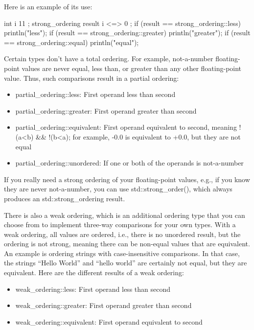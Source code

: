 Here is an example of its use:

\begin{cpp}
int i { 11 };
strong_ordering result { i <=> 0 };
if (result == strong_ordering::less) { println("less"); }
if (result == strong_ordering::greater) { println("greater"); }
if (result == strong_ordering::equal) { println("equal"); }
\end{cpp}

Certain types don’t have a total ordering. For example, not-a-number floating-point values are never equal, less than, or greater than any other floating-point value. Thus, such comparisons result in a partial ordering:

\begin{itemize}
\item
partial\_ordering::less: First operand less than second

\item
partial\_ordering::greater: First operand greater than second

\item
partial\_ordering::equivalent: First operand equivalent to second, meaning !(a<b) \&\& !(b<a); for example, -0.0 is equivalent to +0.0, but they are not equal

\item
partial\_ordering::unordered: If one or both of the operands is not-a-number
\end{itemize}

If you really need a strong ordering of your floating-point values, e.g., if you know they are never not-a-number, you can use std::strong\_order(), which always produces an std::strong\_ordering result.

There is also a weak ordering, which is an additional ordering type that you can choose from to implement three-way comparisons for your own types. With a weak ordering, all values are ordered, i.e., there is no unordered result, but the ordering is not strong, meaning there can be non-equal values that are equivalent. An example is ordering strings with case-insensitive comparisons. In that case, the strings “Hello World” and “hello world” are certainly not equal, but they are equivalent. Here are the different results of a weak ordering:

\begin{itemize}
\item
weak\_ordering::less: First operand less than second

\item
weak\_ordering::greater: First operand greater than second

\item
weak\_ordering::equivalent: First operand equivalent to second
\end{itemize}

